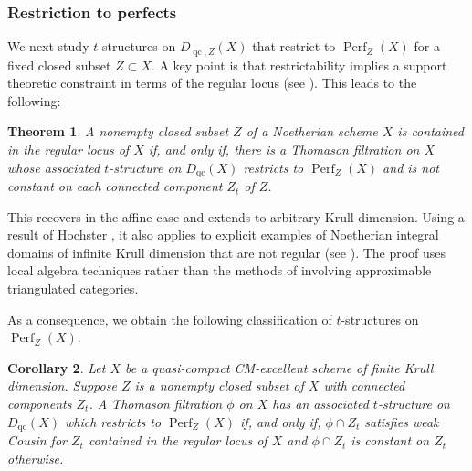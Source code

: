 \documentclass[11pt]{amsart}
\theoremstyle{plain}
\newtheorem{theorem}{Theorem}[section]
\newtheorem{corollary}[theorem]{Corollary}
\theoremstyle{definition}
\numberwithin{equation}{section}
\numberwithin{theorem}{section}
\begin{document}
\subsubsection{Restriction to perfects}
\label{sec:introduction_nonexistence}

We next study $t$-structures on $D_{\operatorname{qc},Z}(X)$ that restrict to $\operatorname{Perf}_Z(X)$ for a fixed closed subset $Z \subset X$. A key point is that restrictability implies a support theoretic constraint in terms of the regular locus (see ). This leads to the following:

\begin{theorem}
    \label{thm:appearance_for_restrictability_via_filtration}
    A nonempty closed subset $Z$ of a Noetherian scheme $X$ is contained in the regular locus of $X$ if, and only if, there is a Thomason filtration on $X$ whose associated $t$-structure on $D_{\operatorname{qc}}(X)$ restricts to $\operatorname{Perf}_Z (X)$ and is not constant on each connected component $Z_t$ of $Z$.
\end{theorem}

This recovers \cite[Theorem 0.1]{Neeman:2022} in the affine case and extends \cite{Smith:2022} to arbitrary Krull dimension. Using a result of Hochster \cite{Hochster:1973}, it also applies to explicit examples of Noetherian integral domains of infinite Krull dimension that are not regular (see ). The proof uses local algebra techniques rather than the methods of \cite{Neeman:2022} involving approximable triangulated categories.

As a consequence, we obtain the following classification of $t$-structures on $\operatorname{Perf}_Z(X)$:

\begin{corollary}
    \label{cor:classification_for_relative_perf}
    Let $X$ be a quasi-compact CM-excellent scheme of finite Krull dimension. Suppose $Z$ is a nonempty closed subset of $X$ with connected components $Z_t$. A Thomason filtration $\phi$ on $X$ has an associated $t$-structure on $D_{\operatorname{qc}}(X)$ which restricts to $\operatorname{Perf}_Z (X)$ if, and only if, $\phi\cap Z_t$ satisfies weak Cousin for $Z_t$ contained in the regular locus of $X$ and $\phi\cap Z_t$ is constant on $Z_t$ otherwise.
\end{corollary}
\end{document}
